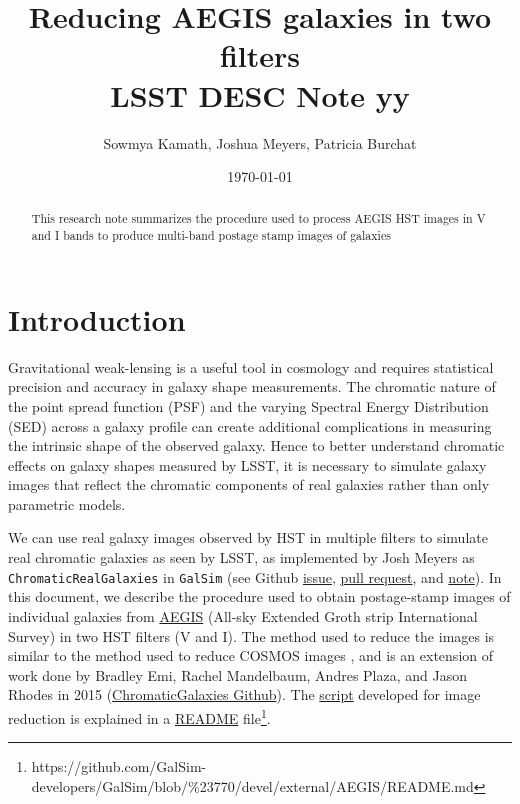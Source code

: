 \documentclass[a4paper,11pt]{article}
\title{Reducing AEGIS galaxies in two filters \\
LSST DESC Note yy}
\author{Sowmya Kamath, Joshua Meyers, Patricia Burchat}
\date{\today}
\begin{document}
\maketitle

\begin{abstract}
This research note summarizes the procedure used to process AEGIS HST images in V and I bands to produce multi-band postage stamp images of galaxies
\end{abstract}

\section{Introduction}
Gravitational weak-lensing is a useful tool in cosmology and requires statistical precision and accuracy in galaxy shape measurements. The chromatic nature of the point spread function (PSF) and the varying Spectral Energy Distribution (SED) across a galaxy profile can create additional complications in measuring the intrinsic shape of the observed galaxy. Hence to better understand chromatic effects on galaxy shapes measured by LSST, it is necessary to simulate galaxy images that reflect the chromatic components of real galaxies rather than only parametric models. 

We can use real galaxy images observed by HST in multiple filters to simulate real chromatic galaxies as seen by LSST, as implemented by Josh Meyers as {\tt ChromaticRealGalaxies} in {\tt GalSim} (see Github
\href{https://github.com/GalSim-developers/GalSim/issues/640}{issue}, 
\href{https://github.com/GalSim-developers/GalSim/pull/687}{pull request},
and 
\href{https://github.com/GalSim-developers/GalSim/blob/\%23640/devel/modules/CGNotes.pdf}{note}). 
In this document, we describe the procedure used to obtain postage-stamp images of individual galaxies from 
\href{http://aegis.ucolick.org/tech_overview.html}{AEGIS} 
(All-sky Extended Groth strip International Survey) in two HST filters (V and I). The method used to reduce the images is similar to the method used  to reduce COSMOS images \citep{Leauthaud2007}, and is an extension of work done by Bradley Emi, Rachel Mandelbaum, Andres Plaza, and Jason Rhodes in 2015 
(\href{https://github.com/bradleyemi/ChromaticGalaxies}{ChromaticGalaxies Github}). The \href{https://github.com/sowmyakth/true_gal_colors}{script} developed for image reduction is explained in a \href{https://github.com/GalSim-developers/GalSim/blob/\%23770/devel/external/AEGIS/README.md}{README} file\footnote{https://github.com/GalSim-developers/GalSim/blob/\%23770/devel/external/AEGIS/README.md}.
\end{document}
